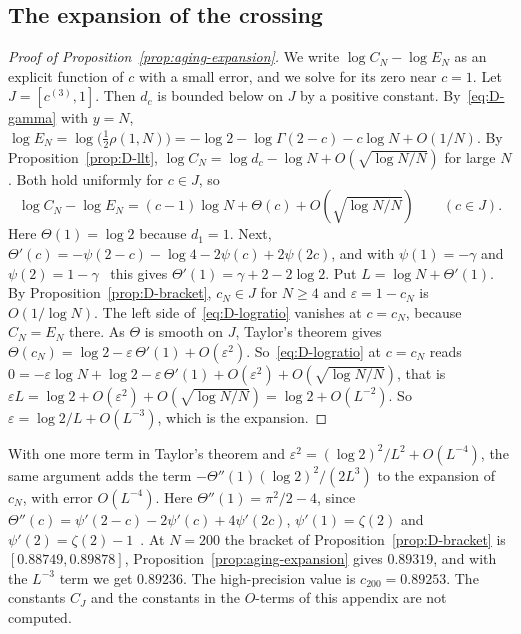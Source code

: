 \subsection{The expansion of the crossing}

\begin{proof}[Proof of Proposition~\ref{prop:aging-expansion}]
We write $\log C_N-\log E_N$ as an explicit function of $c$ with a small
error, and we solve for its zero near $c=1$. Let $J=[c^{(3)},1]$. Then $d_c$ is
bounded below on $J$ by a positive constant. By~\eqref{eq:D-gamma} with
$y=N$,
$\log E_N=\log\bigl(\tfrac12\rho(1,N)\bigr)=-\log2-\log\Gamma(2-c)-c\log N+O(1/N)$.
By Proposition~\ref{prop:D-llt},
$\log C_N=\log d_c-\log N+O(\sqrt{\log N/N})$ for large $N$. Both hold uniformly for
$c\in J$, so
\begin{equation}\label{eq:D-logratio}
\log C_N-\log E_N=(c-1)\log N+\Theta(c)+O(\sqrt{\log N/N})\qquad(c\in J).
\end{equation}
Here $\Theta(1)=\log2$ because $d_1=1$. Next,
$\Theta'(c)=-\psi(2-c)-\log4-2\psi(c)+2\psi(2c)$, and with $\psi(1)=-\gamma$
and $\psi(2)=1-\gamma$~\cite[5.4.12, 5.4.14]{dlmf} this gives
$\Theta'(1)=\gamma+2-2\log2$. Put
$L=\log N+\Theta'(1)$. By Proposition~\ref{prop:D-bracket}, $c_N\in J$ for
$N\ge4$ and $\varepsilon=1-c_N$ is $O(1/\log N)$. The left side
of~\eqref{eq:D-logratio} vanishes at $c=c_N$, because $C_N=E_N$ there. As
$\Theta$ is smooth on $J$, Taylor's theorem gives
$\Theta(c_N)=\log2-\varepsilon\,\Theta'(1)+O(\varepsilon^2)$.
So~\eqref{eq:D-logratio} at $c=c_N$ reads
$0=-\varepsilon\log N+\log2-\varepsilon\,\Theta'(1)+O(\varepsilon^2)+O(\sqrt{\log N/N})$,
that is
$\varepsilon L=\log2+O(\varepsilon^2)+O(\sqrt{\log N/N})=\log2+O(L^{-2})$. So
$\varepsilon=\log2/L+O(L^{-3})$, which is the expansion.
\end{proof}

With one more term in Taylor's theorem and
$\varepsilon^2=(\log2)^2/L^2+O(L^{-4})$, the same argument adds the term
$-\Theta''(1)(\log2)^2/(2L^3)$ to the expansion of $c_N$, with error
$O(L^{-4})$. Here $\Theta''(1)=\pi^2/2-4$, since
$\Theta''(c)=\psi'(2-c)-2\psi'(c)+4\psi'(2c)$, $\psi'(1)=\zeta(2)$ and
$\psi'(2)=\zeta(2)-1$~\cite[5.4.12, 5.15.5]{dlmf}. At $N=200$ the bracket of
Proposition~\ref{prop:D-bracket} is $[0.88749,0.89878]$,
Proposition~\ref{prop:aging-expansion} gives $0.89319$, and with the $L^{-3}$
term we get $0.89236$. The high-precision value is $c_{200}=0.89253$. The
constants $C_J$ and the constants in the $O$-terms of this appendix are not
computed.
